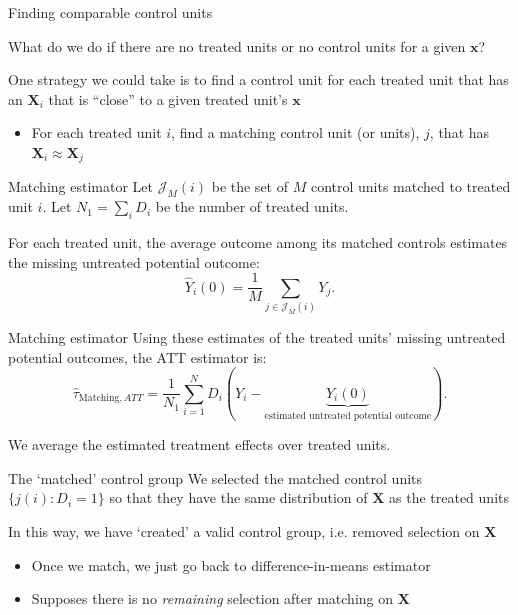 \documentclass[aspectratio=169,t,11pt,table]{beamer}
\begin{document}
\begin{frame}{Finding comparable control units}
  \begin{center}
    What do we do if there are no treated units or no control units for a given $\bm{x}$?
  \end{center}

  \bigskip
  One strategy we could take is to find a control unit for each treated unit that has an $\bm{X}_i$ that is ``close'' to a given treated unit's $\bm{x}$
  \begin{itemize}
    \item For each treated unit $i$, find a matching control unit (or units), $j$, that has $\bm{X}_i \approx \bm{X}_j$
  \end{itemize}
\end{frame}

\begin{frame}{Matching estimator}
  Let $\mathcal{J}_M(i)$ be the set of $M$ control units matched to treated unit $i$. Let $N_1 = \sum_i D_i$ be the number of treated units.
  
  \bigskip 
  For each treated unit, the average outcome among its matched controls estimates the missing untreated potential outcome:
  $$
    \widehat{Y}_i(0) = \frac{1}{M} \sum_{j \in \mathcal{J}_M(i)} Y_j.
  $$
\end{frame}

\begin{frame}{Matching estimator}
  Using these estimates of the treated units' missing untreated potential outcomes, the ATT estimator is:
  $$
    \hat{\tau}_{\text{Matching}, ATT} =
    \frac{1}{N_1} \sum_{i = 1}^N D_i
    \left( Y_i -
    \underbrace{\widehat{Y}_i(0)}_{\text{estimated untreated potential outcome}} \right).
  $$

  \bigskip
  We average the estimated treatment effects over treated units.
\end{frame}
    
\begin{frame}{The `matched' control group}
  We selected the matched control units $\{ j(i): D_i = 1 \}$ so that they have the same distribution of $\bm{X}$ as the treated units
  
  \bigskip
  In this way, we have `created' a valid control group, i.e. removed selection on $\bm{X}$
  \begin{itemize}
    \item Once we match, we just go back to difference-in-means estimator
    
    \item Supposes there is no \emph{remaining} selection after matching on $\bm{X}$
  \end{itemize}
\end{frame}
\end{document}
